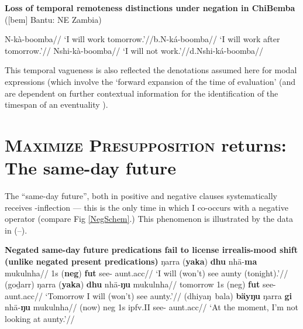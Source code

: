 \pex[glwidth=.4\linewidth,aboveglftskip=.1em]\textbf{Loss of temporal remoteness distinctions under negation in Chi\-Bemba} ([\gls{bem}] Bantu: NE Zambia)%

\a\begingl\gla N-kà-boomba//
\glft`I will work tomorrow.'//\endgl b.\quad\begingl\gla N-ká-boomba//
\glft`I will work after tomorrow.'//\endgl
\a[label=c]\begingl\gla Nshi-kà-boomba//
\glft`I will not work.'//\endgl d.\quad\begingl\gla *Nshi-ká-boomba//\endgl
\xe

This temporal vagueness is also reflected the denotations assumed here for modal expressions (which involve the `forward expansion of the time of evaluation' (and are dependent on further contextual information for the identification of the timespan of an eventuality \citep[12]{Condoravdi2003}).


%


\section[\textsc{\textit{MaxPresupp 2}}: The same-day future]{\textsc{Maximize Presupposition} returns:\\The same-day future}\label{yolngu-sdf}


The ``same-day future'', both in positive and negative clauses systematically receives \I-inflection --- this is the only time in which \gls{I} co-occurs with a negative operator (compare Fig \ref{NegSchem}.) This phenomenon is illustrated by the data in (\nextx--\anextx).

\pex \textbf{Negated same-day future predications fail to license irrealis-mood shift (unlike negated present predications)}\trailingcitation{[AW~20190501]}
\a\begingl\gla {}ŋarra (\textbf{yaka}) \textbf{dhu} nhä-\textbf{ma} mukulnha//
\glb 1s (\textbf{\gls{neg}}) \textbf{\gls{fut}} see-\I{} aunt.\gls{acc}//
\glft `I will (won't) see aunty (tonight).'//\endgl
\a \begingl\gla {}(goḏarr) ŋarra (\textbf{yaka}) \textbf{dhu} nhä-\textbf{ŋu} mukulnha//
\glb tomorrow 1s (\gls{neg}) \textbf{\gls{fut}} see-\II{} aunt.\gls{acc}//
\glft `Tomorrow I will (won't) see aunty.'//\endgl
\a\begingl\gla {}(dhiyaŋ~bala) \textbf{bäyŋu} ŋarra \textbf{gi} nhä-\textbf{ŋu} mukulnha//
\glb (now) \gls{neg} 1s \gls{ipfv}.\gls{II} see-\II{} aunt.\gls{acc}//
\glft `At the moment, I'm not looking at aunty.'//\endgl
\xe

